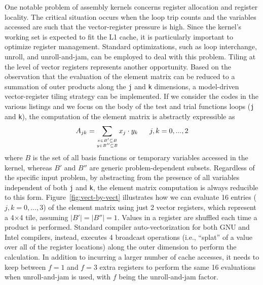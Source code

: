 One notable problem of assembly kernels concerns register allocation and register locality. The critical situation occurs when the loop trip counts and the variables accessed are such that the vector-register pressure is high. Since the kernel's working set is expected to fit the L1 cache, it is particularly important to optimize register management. Standard optimizations, such as loop interchange, unroll, and unroll-and-jam, can be employed to deal with this problem. Tiling at the level of vector registers represents another opportunity. Based on the observation that the evaluation of the element matrix can be reduced to a summation of outer products along the \texttt{j} and \texttt{k} dimensions, a model-driven vector-register tiling strategy can be implemented. If we consider the codes in the various listings and we focus on the body of the test and trial functions loops (\texttt{j} and \texttt{k}), the computation of the element matrix is abstractly expressible as
\begin{equation}
\scriptsize
\label{outer-product}
A_{jk} = \sum_{\substack{
  x \in B' \subseteq B \\
  y \in B'' \subseteq B}}
x_j\cdot y_k ~~~~~~ j,k = 0,...,2
\end{equation}
where $B$ is the set of all basis functions or temporary variables accessed in the kernel, whereas $B'$ and $B''$ are generic problem-dependent subsets. Regardless of the specific input problem, by abstracting from the presence of all variables independent of both \texttt{j} and \texttt{k}, the element matrix computation is always reducible to this form. Figure~\ref{fig:vect-by-vect} illustrates how we can evaluate 16 entries ($j,k=0,...,3$) of the element matrix using just 2 vector registers, which represent a 4$\times$4 tile, assuming $\vert B' \vert = \vert B'' \vert = 1$. Values in a register are shuffled each time a product is performed. Standard compiler auto-vectorization for both GNU and Intel compilers, instead, executes 4 broadcast operations (i.e., ``splat'' of a value over all of the register locations) along the outer dimension to perform the calculation. In addition to incurring a larger number of cache accesses, it needs to keep between $f=1$ and $f=3$ extra registers to perform the same 16 evaluations when unroll-and-jam is used, with $f$ being the unroll-and-jam factor.


